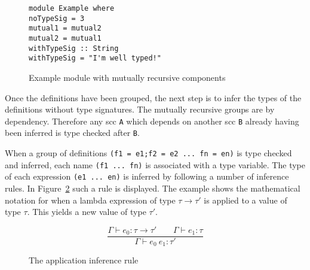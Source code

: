 \begin{figure}[!htb]
\centering
\begin{minipage}[b]{0.55\linewidth}
\centering
\begin{lstlisting}
module Example where
noTypeSig = 3
mutual1 = mutual2
mutual2 = mutual1
withTypeSig :: String
withTypeSig = "I'm well typed!"
\end{lstlisting}
\end{minipage}
\caption{Example module with mutually recursive components}
\label{lst:tc_impl}
\end{figure}

Once the definitions have been grouped, the next step is to infer the types of the definitions without type signatures. The mutually recursive groups are  by dependency. Therefore any \gls{scc} \texttt{A} which depends on another \gls{scc} \texttt{B} already having been inferred is type checked after \texttt{B}. 

When a group of definitions \texttt{(f1 = e1;f2 = e2 ... fn = en)} is type checked and inferred, each name \texttt{(f1 ... fn)} is associated with a type variable. The type of each expression \texttt{(e1 ... en)} is inferred by following a number of inference rules. In Figure~\ref{eq:app} such a rule is displayed. The example shows the mathematical notation for when a lambda expression of type \texttt{$\tau \rightarrow \tau'$} is applied to a value of type \texttt{$\tau$}. This yields a new value of type \texttt{$\tau'$}.

\begin{figure}[!h]
\[
 \displaystyle\frac{\Gamma \vdash e_0:\tau \rightarrow \tau' \quad\quad \Gamma \vdash e_1 : \tau }{\Gamma \vdash e_0\ e_1 : \tau'}
\]
\caption{The application inference rule}
\label{eq:app}
\end{figure}

